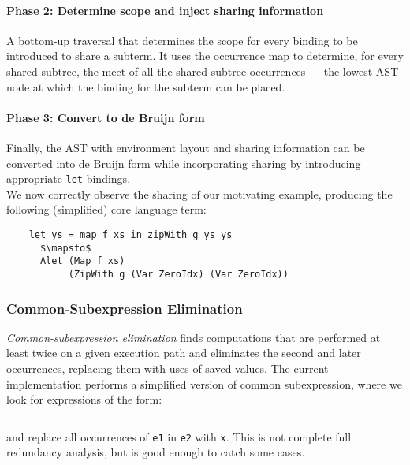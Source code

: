 \paragraph{Phase 2: Determine scope and inject sharing information}

A bottom-up traversal that determines the scope for every binding to be
introduced to share a subterm. It uses the occurrence map to determine, for
every shared subtree, the meet of all the shared subtree occurrences --- the
lowest AST node at which the binding for the subterm can be placed.

\paragraph{Phase 3: Convert to de Bruijn form}

Finally, the AST with environment layout and sharing information can be
converted into de Bruijn form while incorporating sharing by introducing
appropriate \texttt{let} bindings.\\

\noindent
We now correctly observe the sharing of our motivating example, producing the
following (simplified) core language term:
%
\begin{lstlisting}[style=Haskell,numbers=none,mathescape]
%\bf$\langle$ sharing observation $\rangle$%
    let ys = map f xs in zipWith g ys ys
      $\mapsto$
      Alet (Map f xs)
           (ZipWith g (Var ZeroIdx) (Var ZeroIdx))
\end{lstlisting}


\subsubsection{Common-Subexpression Elimination}
\label{sec:cse}

\emph{Common-subexpression elimination} finds computations that are performed at
least twice on a given execution path and eliminates the second and later
occurrences, replacing them with uses of saved values. The current
implementation performs a simplified version of common subexpression, where we
look for expressions of the form:
%
\begin{lstlisting}[style=Haskell,numbers=none]
%\bf$\langle$ common subexpression elimination $\rangle$% let x = e1 in [x/e1]e2
\end{lstlisting}
%
and replace all occurrences of \texttt{e1} in \texttt{e2} with \texttt{x}. This
is not complete full redundancy analysis, but is good enough to catch some
cases.%

